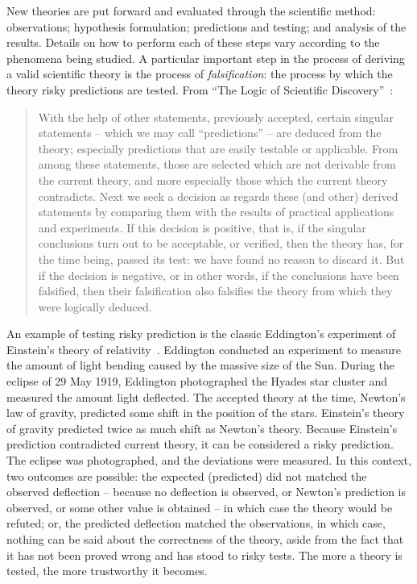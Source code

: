  New theories are put forward and evaluated through the scientific method: observations; hypothesis formulation; predictions and testing; and analysis of the results. Details on how to perform each of these steps vary according to the phenomena being studied. A particular important step in the process of deriving a valid scientific theory is the process of \emph{falsification}: the process by which the theory risky predictions are tested. From ``The Logic of Scientific Discovery''~\cite{popper-scientificdiscovery}:
 \begin{quote}
With the help of other statements, previously accepted, certain singular statements  --  which we may call ``predictions'' -- are deduced from the theory; especially predictions that are easily testable or applicable. From among these statements, those are selected which are not derivable from the current theory, and more especially those which the current theory contradicts. Next we seek a decision as regards these (and other) derived statements by comparing them with the results of practical applications and experiments. If this decision is positive, that is, if the singular conclusions turn out to be acceptable, or verified, then the theory has, for the time being, passed its test: we have found no reason to discard it. But if the decision is negative, or in other words, if the conclusions have been falsified, then their falsification also falsifies the theory from which they were logically deduced.
 \end{quote}
% 
An example of testing risky prediction is the classic Eddington's experiment of Einstein's theory of relativity~\cite{coles2001einstein}. Eddington conducted an experiment to measure the amount of light bending caused by the massive size of the Sun.  During the eclipse of 29 May 1919, Eddington photographed the Hyades star cluster and measured the amount light deflected. The accepted theory at the time, Newton's law of gravity, predicted some shift in the position of the stars. Einstein's theory of gravity predicted twice as much shift as Newton's theory. Because Einstein's prediction contradicted current theory, it can be considered a risky prediction.
The eclipse was photographed, and the deviations were measured.  In this context, two outcomes are possible: the expected (predicted) did not matched the observed deflection -- because no deflection is observed, or Newton's prediction is observed, or some other value is obtained --  in which case the theory would be refuted; or, the predicted deflection matched the observations, in which case, nothing can be said about the correctness of the theory, aside from the fact that it has not been proved wrong and has stood to risky tests. The more a theory is tested, the more trustworthy it becomes. 

